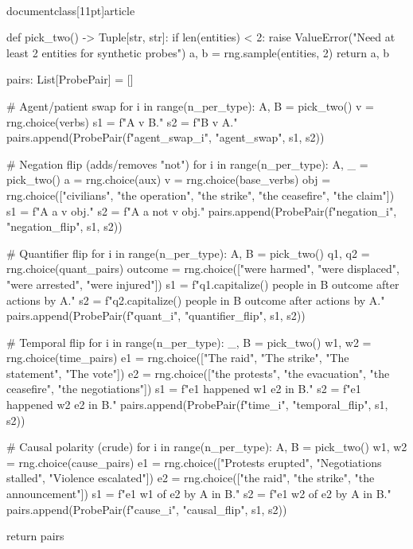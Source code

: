 \\documentclass[11pt]{article}
\begin{document}
\begin{CodeBlock}
    def pick_two() -> Tuple[str, str]:
        if len(entities) < 2:
            raise ValueError("Need at least 2 entities for synthetic probes")
        a, b = rng.sample(entities, 2)
        return a, b

    pairs: List[ProbePair] = []

    # Agent/patient swap
    for i in range(n_per_type):
        A, B = pick_two()
        v = rng.choice(verbs)
        s1 = f"{A} {v} {B}."
        s2 = f"{B} {v} {A}."
        pairs.append(ProbePair(f"agent_swap_{i}", "agent_swap", s1, s2))

    # Negation flip (adds/removes "not")
    for i in range(n_per_type):
        A, _ = pick_two()
        a = rng.choice(aux)
        v = rng.choice(base_verbs)
        obj = rng.choice(["civilians", "the operation", "the strike", "the ceasefire", "the claim"])
        s1 = f"{A} {a} {v} {obj}."
        s2 = f"{A} {a} not {v} {obj}."
        pairs.append(ProbePair(f"negation_{i}", "negation_flip", s1, s2))

    # Quantifier flip
    for i in range(n_per_type):
        A, B = pick_two()
        q1, q2 = rng.choice(quant_pairs)
        outcome = rng.choice(["were harmed", "were displaced", "were arrested", "were injured"])
        s1 = f"{q1.capitalize()} people in {B} {outcome} after actions by {A}."
        s2 = f"{q2.capitalize()} people in {B} {outcome} after actions by {A}."
        pairs.append(ProbePair(f"quant_{i}", "quantifier_flip", s1, s2))

    # Temporal flip
    for i in range(n_per_type):
        _, B = pick_two()
        w1, w2 = rng.choice(time_pairs)
        e1 = rng.choice(["The raid", "The strike", "The statement", "The vote"])
        e2 = rng.choice(["the protests", "the evacuation", "the ceasefire", "the negotiations"])
        s1 = f"{e1} happened {w1} {e2} in {B}."
        s2 = f"{e1} happened {w2} {e2} in {B}."
        pairs.append(ProbePair(f"time_{i}", "temporal_flip", s1, s2))

    # Causal polarity (crude)
    for i in range(n_per_type):
        A, B = pick_two()
        w1, w2 = rng.choice(cause_pairs)
        e1 = rng.choice(["Protests erupted", "Negotiations stalled", "Violence escalated"])
        e2 = rng.choice(["the raid", "the strike", "the announcement"])
        s1 = f"{e1} {w1} of {e2} by {A} in {B}."
        s2 = f"{e1} {w2} of {e2} by {A} in {B}."
        pairs.append(ProbePair(f"cause_{i}", "causal_flip", s1, s2))

    return pairs


\end{CodeBlock}
\end{document}
